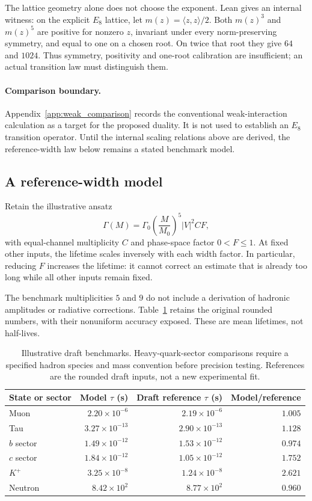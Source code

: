 The lattice geometry alone does not choose the exponent. Lean gives an internal witness: on the explicit $E_8$ lattice, let $m(z)=\langle z,z\rangle/2$. Both $m(z)^3$ and $m(z)^5$ are positive for nonzero $z$, invariant under every norm-preserving symmetry, and equal to one on a chosen root. On twice that root they give $64$ and $1024$. Thus symmetry, positivity and one-root calibration are insufficient; an actual transition law must distinguish them.

\paragraph{Comparison boundary.} Appendix~\ref{app:weak_comparison} records the conventional weak-interaction calculation as a target for the proposed duality. It is not used to establish an $E_8$ transition operator. Until the internal scaling relations above are derived, the reference-width law below remains a stated benchmark model.

\subsection{A reference-width model}
Retain the illustrative ansatz
\begin{equation}\label{eq:reference_width}
\Gamma(M)=\Gamma_0\left(\frac{M}{M_0}\right)^5|V|^2CF,
\end{equation}
with equal-channel multiplicity $C$ and phase-space factor $0<F\leq1$. At fixed other inputs, the lifetime scales inversely with each width factor. In particular, reducing $F$ increases the lifetime: it cannot correct an estimate that is already too long while all other inputs remain fixed.

The benchmark multiplicities $5$ and $9$ do not include a derivation of hadronic amplitudes or radiative corrections. Table~\ref{tab:lifetimes} retains the original rounded numbers, with their nonuniform accuracy exposed. These are mean lifetimes, not half-lives.
\begin{table}[t]
\centering
\caption{Illustrative draft benchmarks. Heavy-quark-sector comparisons require a specified hadron species and mass convention before precision testing. References are the rounded draft inputs, not a new experimental fit.}
\label{tab:lifetimes}
\begin{tabular}{lrrr}\toprule
State or sector & Model $\tau$ (s) & Draft reference $\tau$ (s) & Model/reference \\\midrule
Muon & $2.20\times10^{-6}$ & $2.19\times10^{-6}$ & $1.005$ \\
Tau & $3.27\times10^{-13}$ & $2.90\times10^{-13}$ & $1.128$ \\
$b$ sector & $1.49\times10^{-12}$ & $1.53\times10^{-12}$ & $0.974$ \\
$c$ sector & $1.84\times10^{-12}$ & $1.05\times10^{-12}$ & $1.752$ \\
$K^+$ & $3.25\times10^{-8}$ & $1.24\times10^{-8}$ & $2.621$ \\
Neutron & $8.42\times10^2$ & $8.77\times10^2$ & $0.960$ \\\bottomrule
\end{tabular}
\end{table}

